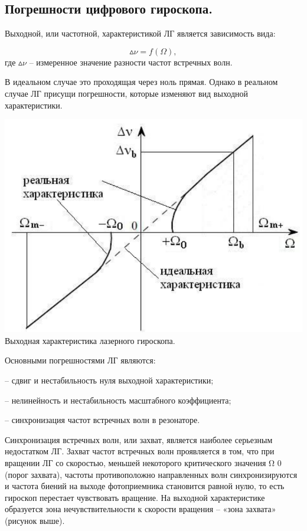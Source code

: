 \documentclass[a4paper,12pt]{article} %
\begin{document}
\subsection{Погрешности цифрового гироскопа.}

Выходной, или частотной, характеристикой ЛГ является зависимость вида:

\begin{equation}
    \vartriangle \! \! \nu = f(\Omega),
\end{equation}
где $\vartriangle \! \! \nu$ -- измеренное значение разности частот встречных волн.

В идеальном случае это проходящая через ноль прямая. Однако в реальном
случае ЛГ присущи погрешности, которые изменяют вид выходной характеристики.

\begin{center}
    \includegraphics[scale=0.8]{pic4}\\
    \caption{Выходная характеристика лазерного гироскопа.}
\end{center}

Основными погрешностями ЛГ являются:

-- сдвиг и нестабильность нуля выходной характеристики;

-- нелинейность и нестабильность масштабного коэффициента;

-- синхронизация частот встречных волн в резонаторе.

Синхронизация встречных волн, или захват, является наиболее серьезным
недостатком ЛГ. Захват частот встречных волн проявляется в том, что при вращении ЛГ со скоростью, меньшей некоторого критического значения Ω 0 (порог
захвата), частоты противоположно направленных волн синхронизируются и частота биений на выходе фотоприемника становится равной нулю, то есть гироскоп перестает чувствовать вращение. На выходной характеристике образуется
зона нечувствительности к скорости вращения – «зона захвата» (рисунок выше).
\end{document}
